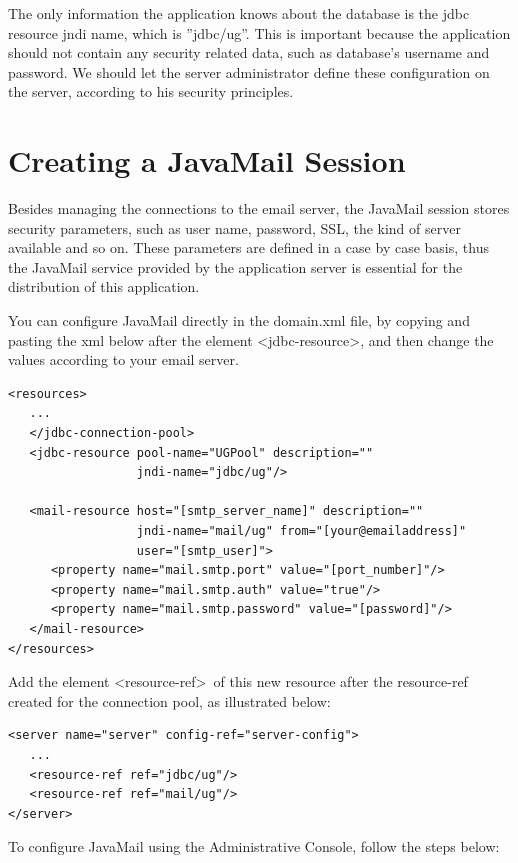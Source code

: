 \documentclass[envcountsame,envcountchap]{svmono}
\begin{document}
The only information the application knows about the database is the jdbc resource jndi name, which is ''jdbc/ug''. This is important because the application should not contain any security related data, such as database's username and password. We should let the server administrator define these configuration on the server, according to his security principles.

\section{Creating a JavaMail Session}

Besides managing the connections to the email server, the JavaMail session stores security parameters, such as user name, password, SSL, the kind of server available and so on. These parameters are defined in a case by case basis, thus the JavaMail service provided by the application server is essential for the distribution of this application.

You can configure JavaMail directly in the domain.xml file, by copying and pasting the xml below after the element \textless jdbc-resource\textgreater, and then change the values according to your email server.

\begin{verbatim}
<resources>
   ...
   </jdbc-connection-pool>
   <jdbc-resource pool-name="UGPool" description="" 
                  jndi-name="jdbc/ug"/>

   <mail-resource host="[smtp_server_name]" description="" 
                  jndi-name="mail/ug" from="[your@emailaddress]"
                  user="[smtp_user]">
      <property name="mail.smtp.port" value="[port_number]"/>
      <property name="mail.smtp.auth" value="true"/>
      <property name="mail.smtp.password" value="[password]"/>
   </mail-resource>
</resources>
\end{verbatim}

Add the element \textless resource-ref\textgreater \ of this new resource after the resource-ref created for the connection pool, as illustrated below:

\begin{verbatim}
<server name="server" config-ref="server-config">
   ...
   <resource-ref ref="jdbc/ug"/>
   <resource-ref ref="mail/ug"/>
</server>
\end{verbatim}

To configure JavaMail using the Administrative Console, follow the steps below:
\end{document}
